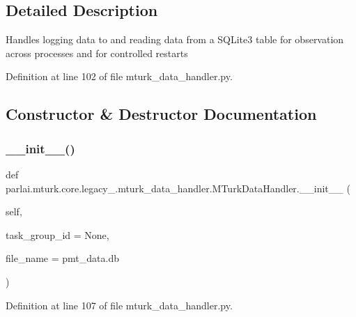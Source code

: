 \subsection{Detailed Description}
\begin{DoxyVerb}Handles logging data to and reading data from a SQLite3 table for
observation across processes and for controlled restarts
\end{DoxyVerb}
 

Definition at line 102 of file mturk\+\_\+data\+\_\+handler.\+py.



\subsection{Constructor \& Destructor Documentation}
\mbox{\label{classparlai_1_1mturk_1_1core_1_1legacy__2018_1_1mturk__data__handler_1_1MTurkDataHandler_a29c63ed977f51176d78bffe42f5d21fe}} 
\subsubsection{\texorpdfstring{\+\_\+\+\_\+init\+\_\+\+\_\+()}{\_\_init\_\_()}}
{\footnotesize\ttfamily def parlai.\+mturk.\+core.\+legacy\+\_.\+mturk\+\_\+data\+\_\+handler.\+M\+Turk\+Data\+Handler.\+\_\+\+\_\+init\+\_\+\+\_\+ (\begin{DoxyParamCaption}\item[{}]{self,  }\item[{}]{task\+\_\+group\+\_\+id = {\ttfamily None},  }\item[{}]{file\+\_\+name = {\ttfamily \textquotesingle{}pmt\+\_\+data.db\textquotesingle{}} }\end{DoxyParamCaption})}



Definition at line 107 of file mturk\+\_\+data\+\_\+handler.\+py.



